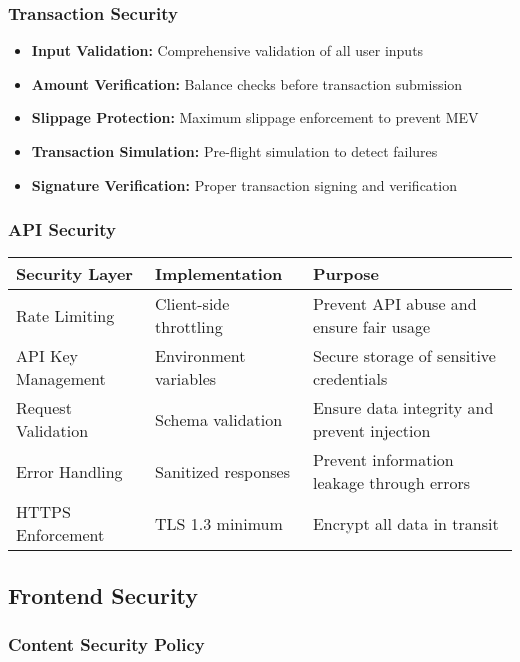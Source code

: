 \documentclass[12pt,a4paper]{article}
\begin{document}
\subsubsection{Transaction Security}

\begin{itemize}
    \item \textbf{Input Validation:} Comprehensive validation of all user inputs
    \item \textbf{Amount Verification:} Balance checks before transaction submission
    \item \textbf{Slippage Protection:} Maximum slippage enforcement to prevent MEV
    \item \textbf{Transaction Simulation:} Pre-flight simulation to detect failures
    \item \textbf{Signature Verification:} Proper transaction signing and verification
\end{itemize}

\subsubsection{API Security}

\begin{longtable}{|p{3cm}|p{4cm}|p{6cm}|}
\hline
\textbf{Security Layer} & \textbf{Implementation} & \textbf{Purpose} \\
\hline
\endhead

Rate Limiting & Client-side throttling & Prevent API abuse and ensure fair usage \\
\hline
API Key Management & Environment variables & Secure storage of sensitive credentials \\
\hline
Request Validation & Schema validation & Ensure data integrity and prevent injection \\
\hline
Error Handling & Sanitized responses & Prevent information leakage through errors \\
\hline
HTTPS Enforcement & TLS 1.3 minimum & Encrypt all data in transit \\
\hline
\end{longtable}

\subsection{Frontend Security}

\subsubsection{Content Security Policy}
\end{document}
